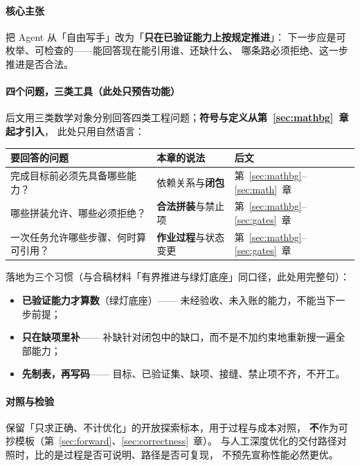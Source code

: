 \documentclass[UTF8,a4paper,11pt]{ctexart}
\theoremstyle{definition}
\theoremstyle{plain}
\theoremstyle{remark}
\numberwithin{figure}{section}
\numberwithin{table}{section}
\begin{document}
\paragraph{核心主张}
把 Agent 从「自由写手」改为「\textbf{只在已验证能力上按规定推进}」：
下一步应是可枚举、可检查的——能回答现在能引用谁、还缺什么、
哪条路必须拒绝、这一步推进是否合法。

\paragraph{四个问题，三类工具（此处只预告功能）}
后文用三类数学对象分别回答四类工程问题；\textbf{符号与定义从第~\ref{sec:mathbg}~章起才引入}，
此处只用自然语言：

\begin{center}
\small
\begin{tabular}{@{}L{4.2cm}L{4.8cm}L{4.2cm}@{}}
  \toprule
  要回答的问题 & 本章的说法 & 后文 \\
  \midrule
  完成目标前必须先具备哪些能力？ &
  依赖关系与\textbf{闭包} &
  第~\ref{sec:mathbg}--\ref{sec:math}~章 \\
  哪些拼装允许、哪些必须拒绝？ &
  \textbf{合法拼装}与禁止项 &
  第~\ref{sec:mathbg}--\ref{sec:gates}~章 \\
  一次任务允许哪些步骤、何时算可引用？ &
  \textbf{作业过程}与状态变更 &
  第~\ref{sec:mathbg}--\ref{sec:gates}~章 \\
  \bottomrule
\end{tabular}
\end{center}

落地为三个习惯（与合稿材料「有界推进与绿灯底座」同口径，此处用完整句）：

\begin{itemize}
  \item \textbf{已验证能力才算数}（绿灯底座）——
        未经验收、未入账的能力，不能当下一步前提；
  \item \textbf{只在缺项里补}——
        补缺针对闭包中的缺口，而不是不加约束地重新搜一遍全部能力；
  \item \textbf{先制表，再写码}——
        目标、已验证集、缺项、接缝、禁止项不齐，不开工。
\end{itemize}

\paragraph{对照与检验}
保留「只求正确、不计优化」的开放探索标本，用于过程与成本对照，
\textbf{不}作为可抄模板（第~\ref{sec:forward}、\ref{sec:correctness}~章）。
与人工深度优化的交付路径对照时，比的是过程是否可说明、路径是否可复现，
不预先宣称性能必然更优。
\end{document}

